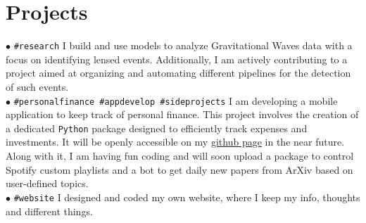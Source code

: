 \documentclass[letterpaper]{twentysecondcv} %
\begin{document}
\begin{twenty} %
\end{twenty}


\section{Projects}

\iffalse
\begin{twentymedium} %
    \twentyitemmedium{research}{PostDoc Researcher \dots .}{}{}
    \twentyitemmedium{website}{I created \dots .}{}{}
    \twentyitemmedium{app}{I am developing.}{}{}
    \twentyitemmedium{personal\\finance}{I created a package \dots .}{}{}
\end{twentymedium}
\fi

$\bullet$ \texttt{\#research}  
          {\small %
          I build and use models to analyze Gravitational Waves data with a focus on identifying lensed events. Additionally, I am actively contributing to a project aimed at organizing and automating different pipelines for the detection of such events.}\\ 
$\bullet$ \texttt{\#personalfinance \#appdevelop \#sideprojects}
          {\small I am developing a mobile application to keep track of personal finance.
          This project involves the creation of a dedicated \texttt{Python} package designed to efficiently track expenses and investments. It will be openly accessible on my \href{https://github.com/PaoloCremo}{github page} in the near future. Along with it, I am having fun coding and will soon upload a package to control Spotify custom playlists and a bot to get daily new papers from ArXiv based on user-defined topics.}\\
$\bullet$ \texttt{\#website}   
          {\small I designed and coded my own website, where I keep my info, thoughts and different things.}
\end{document}
